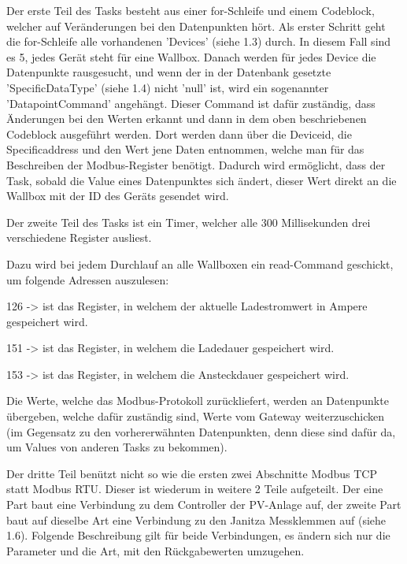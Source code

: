 Der erste Teil des Tasks besteht aus einer for-Schleife und einem Codeblock, welcher auf Veränderungen bei den Datenpunkten hört. Als erster Schritt geht die for-Schleife alle vorhandenen 'Devices' (siehe 1.3) durch. In diesem Fall sind es 5, jedes Gerät steht für eine Wallbox. Danach werden für jedes Device die Datenpunkte rausgesucht, und wenn der in der Datenbank gesetzte 'SpecificDataType' (siehe 1.4) nicht 'null' ist, wird ein sogenannter 'DatapointCommand' angehängt. Dieser Command ist dafür zuständig, dass Änderungen bei den Werten erkannt und dann in dem oben beschriebenen Codeblock ausgeführt werden. Dort werden dann über die Deviceid, die Specificaddress und den Wert jene Daten entnommen, welche man für das Beschreiben der Modbus-Register benötigt. Dadurch wird ermöglicht, dass der Task, sobald die Value eines Datenpunktes sich ändert, dieser Wert direkt an die Wallbox mit der ID des Geräts gesendet wird.

Der zweite Teil des Tasks ist ein Timer, welcher alle 300 Millisekunden drei verschiedene Register ausliest.

Dazu wird bei jedem Durchlauf an alle Wallboxen ein read-Command geschickt, um folgende Adressen auszulesen:

\begin{compactitem}
  \item 126 -> ist das Register, in welchem der aktuelle Ladestromwert in Ampere gespeichert wird.
  \item 151 -> ist das Register, in welchem die Ladedauer gespeichert wird.
  \item 153 -> ist das Register, in welchem die Ansteckdauer gespeichert wird.
\end{compactitem}



Die Werte, welche das Modbus-Protokoll zurückliefert, werden an Datenpunkte übergeben, welche dafür zuständig sind, Werte vom Gateway weiterzuschicken (im Gegensatz zu den vorhererwähnten Datenpunkten, denn diese sind dafür da, um Values von anderen Tasks zu bekommen).

Der dritte Teil benützt nicht so wie die ersten zwei Abschnitte Modbus TCP statt Modbus RTU. Dieser ist wiederum in weitere 2 Teile aufgeteilt. Der eine Part baut eine Verbindung zu dem Controller der PV-Anlage auf, der zweite Part baut auf dieselbe Art eine Verbindung zu den Janitza Messklemmen auf (siehe 1.6). Folgende Beschreibung gilt für beide Verbindungen, es ändern sich nur die Parameter und die Art, mit den Rückgabewerten umzugehen.

